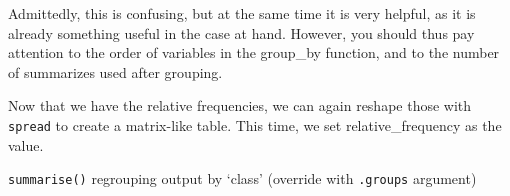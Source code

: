 \documentclass[]{tufte-book}
\newenvironment{Shaded}{}{}
\newcommand{\DataTypeTok}[1]{\textcolor[rgb]{0.56,0.13,0.00}{#1}}
\newcommand{\DecValTok}[1]{\textcolor[rgb]{0.25,0.63,0.44}{#1}}
\newcommand{\KeywordTok}[1]{\textcolor[rgb]{0.00,0.44,0.13}{\textbf{#1}}}
\newcommand{\NormalTok}[1]{#1}
\newcommand{\OperatorTok}[1]{\textcolor[rgb]{0.40,0.40,0.40}{#1}}
\newcommand{\StringTok}[1]{\textcolor[rgb]{0.25,0.44,0.63}{#1}}
\begin{document}
Admittedly, this is confusing, but at the same time it is very helpful, as it is already something useful in the case at hand. However, you should thus pay attention to the order of variables in the group\_by function, and to the number of summarizes used after grouping.

Now that we have the relative frequencies, we can again reshape those with \texttt{spread} to create a matrix-like table. This time, we set relative\_frequency as the value.

\begin{Shaded}
\end{Shaded}

\texttt{summarise()} regrouping output by `class' (override with \texttt{.groups} argument)
\end{document}
